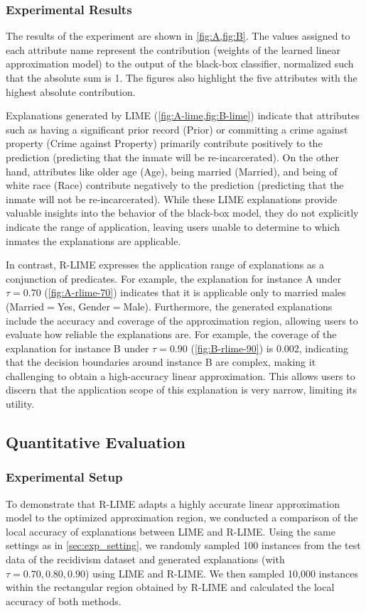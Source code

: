 \documentclass[runningheads]{llncs}
\begin{document}
\subsubsection{Experimental Results}
The results of the experiment are shown in \cref{fig:A,fig:B}.
The values assigned to each attribute name represent the contribution (weights of the learned linear approximation model) to the output of the black-box classifier, normalized such that the absolute sum is 1.
The figures also highlight the five attributes with the highest absolute contribution.

Explanations generated by LIME (\cref{fig:A-lime,fig:B-lime}) indicate that attributes such as having a significant prior record (Prior) or committing a crime against property (Crime against Property) primarily contribute positively to the prediction (predicting that the inmate will be re-incarcerated). On the other hand, attributes like older age (Age), being married (Married), and being of white race (Race) contribute negatively to the prediction (predicting that the inmate will not be re-incarcerated). While these LIME explanations provide valuable insights into the behavior of the black-box model, they do not explicitly indicate the range of application, leaving users unable to determine to which inmates the explanations are applicable.

In contrast, R-LIME expresses the application range of explanations
as a conjunction of predicates.
For example, the explanation for instance A
under $\tau=0.70$ (\cref{fig:A-rlime-70}) indicates that it is applicable
only to married males (Married$=$Yes, Gender$=$Male).
Furthermore, the generated explanations include the accuracy and coverage of
the approximation region, allowing users to evaluate how reliable the
explanations are.
For example, the coverage of the explanation for instance B under $\tau=0.90$
(\cref{fig:B-rlime-90}) is 0.002,
indicating that the decision boundaries around instance B are complex,
making it challenging to obtain a high-accuracy linear approximation.
This allows users to discern that the application scope of this explanation is
very narrow, limiting its utility.

\subsection{Quantitative Evaluation}\label{sec:exp2}
\subsubsection{Experimental Setup}
To demonstrate that R-LIME adapts a highly accurate linear approximation model
to the optimized approximation region,
we conducted a comparison of the local accuracy of explanations
between LIME and R-LIME.
Using the same settings as in \cref{sec:exp_setting},
we randomly sampled 100 instances from the test data of the recidivism dataset
and generated explanations (with $\tau=0.70,0.80,0.90$) using LIME and R-LIME.
We then sampled 10,000 instances within the rectangular region obtained by R-LIME and calculated the local accuracy of both methods.
\end{document}
